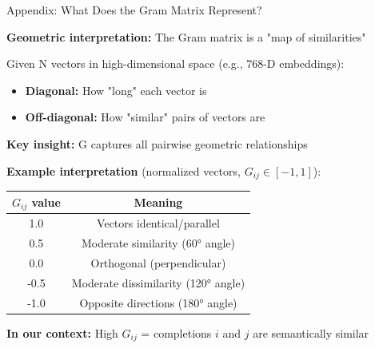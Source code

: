 \documentclass[aspectratio=169,11pt]{beamer}
\begin{document}
\begin{frame}{Appendix: What Does the Gram Matrix Represent?}

\textbf{Geometric interpretation:} The Gram matrix is a "map of similarities"

\vspace{0.5em}

Given N vectors in high-dimensional space (e.g., 768-D embeddings):

\begin{itemize}
  \item \textbf{Diagonal:} How "long" each vector is
  \item \textbf{Off-diagonal:} How "similar" pairs of vectors are
\end{itemize}

\vspace{0.5em}

\textbf{Key insight:} G captures all pairwise geometric relationships

\vspace{0.3em}

\textbf{Example interpretation} (normalized vectors, $G_{ij} \in [-1, 1]$):

\begin{center}
\begin{tabular}{cc}
\toprule
\textbf{$G_{ij}$ value} & \textbf{Meaning} \\
\midrule
1.0 & Vectors identical/parallel \\
0.5 & Moderate similarity (60° angle) \\
0.0 & Orthogonal (perpendicular) \\
-0.5 & Moderate dissimilarity (120° angle) \\
-1.0 & Opposite directions (180° angle) \\
\bottomrule
\end{tabular}
\end{center}

\vspace{0.3em}

\textbf{In our context:} High $G_{ij}$ = completions $i$ and $j$ are semantically similar

\end{frame}
\end{document}
